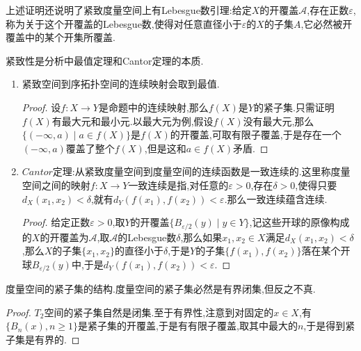 上述证明还说明了紧致度量空间上有Lebesgue数引理:给定$X$的开覆盖$\mathscr{A}$,存在正数$\varepsilon$,称为关于这个开覆盖的Lebesgue数,使得对任意直径小于$\varepsilon$的$X$的子集$A$,它必然被开覆盖中的某个开集所覆盖.

紧致性是分析中最值定理和Cantor定理的本质.
\begin{enumerate}
	\item 紧致空间到序拓扑空间的连续映射会取到最值.
	\begin{proof}
		
		设$f:X\to Y$是命题中的连续映射,那么$f(X)$是$Y$的紧子集.只需证明$f(X)$有最大元和最小元.以最大元为例,假设$f(X)$没有最大元,那么$\{(-\infty,a)\mid a\in f(X)\}$是$f(X)$的开覆盖,可取有限子覆盖,于是存在一个$(-\infty,a)$覆盖了整个$f(X)$,但是这和$a\in f(X)$矛盾.
	\end{proof}
	\item  $Cantor$定理:从紧致度量空间到度量空间的连续函数是一致连续的.这里称度量空间之间的映射$f:X\to Y$一致连续是指,对任意的$\varepsilon>0$,存在$\delta>0$,使得只要$d_X(x_1,x_2)<\delta$,就有$d_Y(f(x_1),f(x_2))<\varepsilon$.那么一致连续蕴含连续.
	\begin{proof}
		
		给定正数$\varepsilon>0$,取$Y$的开覆盖$\{B_{\varepsilon/2}(y)\mid y\in Y\}$,记这些开球的原像构成的$X$的开覆盖为$\mathscr{A}$,取$\mathscr{A}$的Lebesgue数$\delta$,那么如果$x_1,x_2\in X$满足$d_X(x_1,x_2)<\delta$,那么$X$的子集$\{x_1,x_2\}$的直径小于$\delta$,于是$Y$的子集$\{f(x_1),f(x_2)\}$落在某个开球$B_{\varepsilon/2}(y)$中,于是$d_Y(f(x_1),f(x_2))<\varepsilon$.
	\end{proof}
\end{enumerate}

度量空间的紧子集的结构.度量空间的紧子集必然是有界闭集,但反之不真.
\begin{proof}
	
	$T_2$空间的紧子集自然是闭集.至于有界性,注意到对固定的$x\in X$,有$\{B_n(x),n\ge1\}$是紧子集的开覆盖,于是有有限子覆盖,取其中最大的$n$,于是得到紧子集是有界的.
\end{proof}

